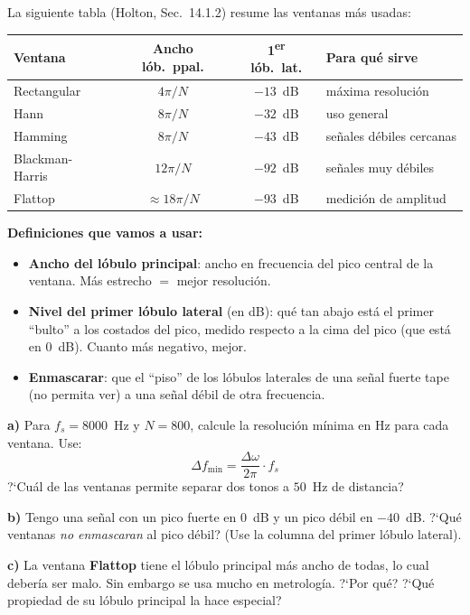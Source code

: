 \documentclass[11pt, a4paper]{article}
\begin{document}
\begin{enun}
La siguiente tabla (Holton, Sec.~14.1.2) resume las ventanas m\'as usadas:

\begin{center}
\small
\begin{tabular}{lccl}
\toprule
\textbf{Ventana} & \textbf{Ancho l\'ob.\ ppal.} & \textbf{1\textsuperscript{er} l\'ob.\ lat.} & \textbf{Para qu\'e sirve} \\
\midrule
Rectangular     & $4\pi/N$   & $-13$~dB  & m\'axima resoluci\'on \\
Hann            & $8\pi/N$   & $-32$~dB  & uso general \\
Hamming         & $8\pi/N$   & $-43$~dB  & se\~nales d\'ebiles cercanas \\
Blackman-Harris & $12\pi/N$  & $-92$~dB  & se\~nales muy d\'ebiles \\
Flattop         & $\approx 18\pi/N$ & $-93$~dB & medici\'on de amplitud \\
\bottomrule
\end{tabular}
\end{center}

\textbf{Definiciones que vamos a usar:}
\begin{itemize}[noitemsep]
  \item \textbf{Ancho del l\'obulo principal}: ancho en frecuencia del pico
    central de la ventana. M\'as estrecho $=$ mejor resoluci\'on.
  \item \textbf{Nivel del primer l\'obulo lateral} (en dB): qu\'e tan abajo
    est\'a el primer ``bulto'' a los costados del pico, medido respecto a la
    cima del pico (que est\'a en 0~dB). Cuanto m\'as negativo, mejor.
  \item \textbf{Enmascarar}: que el ``piso'' de los l\'obulos laterales de
    una se\~nal fuerte tape (no permita ver) a una se\~nal d\'ebil de otra
    frecuencia.
\end{itemize}

\textbf{a)} Para $f_s = 8000$~Hz y $N = 800$, calcule la resoluci\'on
m\'inima en Hz para cada ventana. Use:
\[
  \Delta f_{\min} = \frac{\Delta\omega}{2\pi} \cdot f_s
\]
?`Cu\'al de las ventanas permite separar dos tonos a $50$~Hz de distancia?

\textbf{b)} Tengo una se\~nal con un pico fuerte en $0$~dB y un pico d\'ebil
en $-40$~dB. ?`Qu\'e ventanas \emph{no enmascaran} al pico d\'ebil? (Use la
columna del primer l\'obulo lateral).

\textbf{c)} La ventana \textbf{Flattop} tiene el l\'obulo principal m\'as ancho
de todas, lo cual deber\'ia ser malo. Sin embargo se usa mucho en metrolog\'ia.
?`Por qu\'e? ?`Qu\'e propiedad de su l\'obulo principal la hace especial?
\end{enun}
\end{document}
